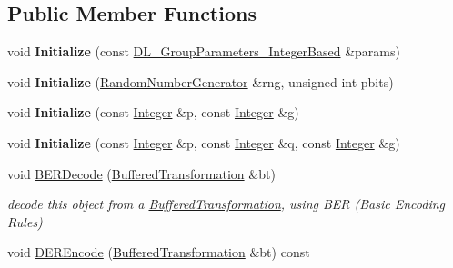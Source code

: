 \subsection*{Public Member Functions}
\begin{DoxyCompactItemize}
\item 
\hypertarget{class_d_l___group_parameters___integer_based_ac0a0277c8d9d397cc30722aac33ad1b6}{
void {\bfseries Initialize} (const \hyperlink{class_d_l___group_parameters___integer_based}{DL\_\-GroupParameters\_\-IntegerBased} \&params)}
\label{class_d_l___group_parameters___integer_based_ac0a0277c8d9d397cc30722aac33ad1b6}

\item 
\hypertarget{class_d_l___group_parameters___integer_based_a2ea22939c10623a4b76167a538ca7c76}{
void {\bfseries Initialize} (\hyperlink{class_random_number_generator}{RandomNumberGenerator} \&rng, unsigned int pbits)}
\label{class_d_l___group_parameters___integer_based_a2ea22939c10623a4b76167a538ca7c76}

\item 
\hypertarget{class_d_l___group_parameters___integer_based_a25973fc93a80e0f199818633d63d205a}{
void {\bfseries Initialize} (const \hyperlink{class_integer}{Integer} \&p, const \hyperlink{class_integer}{Integer} \&g)}
\label{class_d_l___group_parameters___integer_based_a25973fc93a80e0f199818633d63d205a}

\item 
\hypertarget{class_d_l___group_parameters___integer_based_ac55789bf312e004b6d7d67ec3124ec7e}{
void {\bfseries Initialize} (const \hyperlink{class_integer}{Integer} \&p, const \hyperlink{class_integer}{Integer} \&q, const \hyperlink{class_integer}{Integer} \&g)}
\label{class_d_l___group_parameters___integer_based_ac55789bf312e004b6d7d67ec3124ec7e}

\item 
\hypertarget{class_d_l___group_parameters___integer_based_a9a13e3dd2da2b154d8296f306e2ee2a9}{
void \hyperlink{class_d_l___group_parameters___integer_based_a9a13e3dd2da2b154d8296f306e2ee2a9}{BERDecode} (\hyperlink{class_buffered_transformation}{BufferedTransformation} \&bt)}
\label{class_d_l___group_parameters___integer_based_a9a13e3dd2da2b154d8296f306e2ee2a9}

\begin{DoxyCompactList}\small\item\em decode this object from a \hyperlink{class_buffered_transformation}{BufferedTransformation}, using BER (Basic Encoding Rules) \item\end{DoxyCompactList}\item 
\hypertarget{class_d_l___group_parameters___integer_based_ad1ae53e3f7253db8f7056a93e9d05e24}{
void \hyperlink{class_d_l___group_parameters___integer_based_ad1ae53e3f7253db8f7056a93e9d05e24}{DEREncode} (\hyperlink{class_buffered_transformation}{BufferedTransformation} \&bt) const }
\label{class_d_l___group_parameters___integer_based_ad1ae53e3f7253db8f7056a93e9d05e24}


\end{DoxyCompactItemize}
